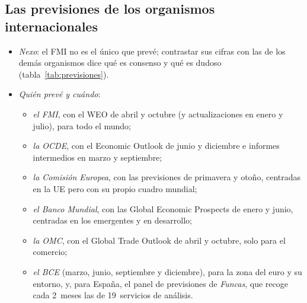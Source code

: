\documentclass[11pt]{article}
\begin{document}
\subsection{Las previsiones de los organismos internacionales}\label{sec:previsiones}

\begin{itemize}
\item \emph{Nexo}: el FMI no es el único que prevé; contrastar sus cifras con las de los demás organismos dice qué es consenso y qué es dudoso (tabla~\ref{tab:previsiones}).
\item \emph{Quién prevé y cuándo}:
  \begin{itemize}
  \item \emph{el FMI}, con el WEO de abril y octubre (y actualizaciones en enero y julio), para todo el mundo;
  \item \emph{la OCDE}, con el Economic Outlook de junio y diciembre e informes intermedios en marzo y septiembre;
  \item \emph{la Comisión Europea}, con las previsiones de primavera y otoño, centradas en la UE pero con su propio cuadro mundial;
  \item \emph{el Banco Mundial}, con las Global Economic Prospects de enero y junio, centradas en los emergentes y en desarrollo;
  \item \emph{la OMC}, con el Global Trade Outlook de abril y octubre, solo para el comercio;
  \item \emph{el BCE} (marzo, junio, septiembre y diciembre), para la zona del euro y su entorno, y, para España, el panel de previsiones de \emph{Funcas}, que recoge cada 2~meses las de 19~servicios de análisis.
  \end{itemize}
\end{itemize}
\end{document}
